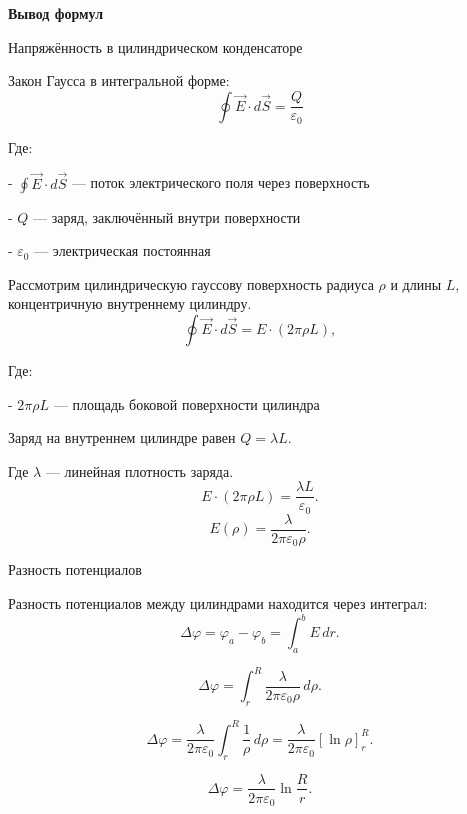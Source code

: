 \documentclass[12pt]{article}
\begin{document}
    \smallvspace

    \begin{flushleft}
        {\large \textbf{Вывод формул}}
    \end{flushleft}

    \begin{flushleft}
        {\large Напряжённость в цилиндрическом конденсаторе}
    \end{flushleft}


    Закон Гаусса в интегральной форме:  
    \[
    \oint \vec{E} \cdot d\vec{S} = \frac{Q}{\varepsilon_0}
    \]  

    Где:
   
   - $\oint \vec{E} \cdot d\vec{S}$ — поток электрического поля через поверхность
   
   - $Q$ — заряд, заключённый внутри поверхности
   
   - $\varepsilon_0$ — электрическая постоянная
   
    Рассмотрим цилиндрическую гауссову поверхность радиуса $\rho$ и длины $L$, концентричную внутреннему цилиндру.  
    \[
    \oint \vec{E} \cdot d\vec{S} = E \cdot (2 \pi \rho L),
    \]  
    
    Где:
    
    - $2 \pi \rho L$ — площадь боковой поверхности цилиндра

    \clearpage

    Заряд на внутреннем цилиндре равен $Q = \lambda L$.
    
    Где $\lambda$ — линейная плотность заряда.  
    \[
    E \cdot (2 \pi \rho L) = \frac{\lambda L}{\varepsilon_0}.
    \]
    \[
    E(\rho) = \frac{\lambda}{2 \pi \varepsilon_0 \rho}.
    \]

    \begin{flushleft}
        {\large Разность потенциалов}
    \end{flushleft}

    Разность потенциалов между цилиндрами находится через интеграл:  
    \[
    \Delta \varphi = \varphi_a - \varphi_b = \int_a^b E \, dr.
    \]
 
    \[
    \Delta \varphi = \int_r^R \frac{\lambda}{2 \pi \varepsilon_0 \rho} \, d\rho.
    \]

    \[
    \Delta \varphi = \frac{\lambda}{2 \pi \varepsilon_0} \int_r^R \frac{1}{\rho} \, d\rho = \frac{\lambda}{2 \pi \varepsilon_0} \left[ \ln \rho \right]_r^R.
    \]

    \[
    \Delta \varphi = \frac{\lambda}{2 \pi \varepsilon_0} \ln\frac{R}{r}.
    \]
\end{document}

